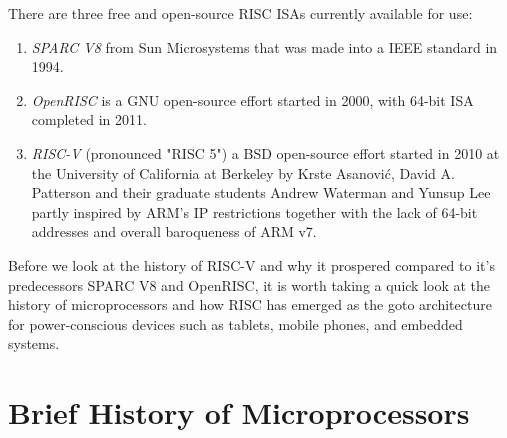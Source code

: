 \documentclass[journal]{IEEEtran}
\begin{document}
There are three free and open-source RISC ISAs currently available for use\cite{asanovic_instruction_2014}:
\begin{enumerate}
    \item \emph{SPARC V8} from Sun Microsystems that was made into a IEEE standard in 1994.
    \item \emph{OpenRISC} is a GNU open-source effort started in 2000, with 64-bit ISA completed in 2011.
    \item \emph{RISC-V} (pronounced "RISC 5") a BSD open-source effort started in 2010 at the University of California at Berkeley by Krste Asanović, David A. Patterson and their graduate students Andrew Waterman and Yunsup Lee partly inspired by ARM's IP restrictions together with the lack of 64-bit addresses and overall baroqueness of ARM v7.
\end{enumerate}

Before we look at the history of RISC-V and why it prospered compared to it's predecessors SPARC V8 and OpenRISC, it is worth taking a quick look at the history of microprocessors and how RISC has emerged as the goto architecture for power-conscious devices such as tablets, mobile phones, and embedded systems.

\section{Brief History of Microprocessors}
\end{document}

